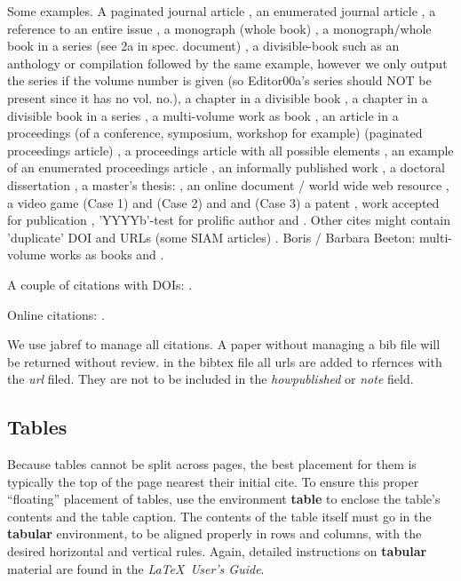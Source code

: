\documentclass[sigconf]{acmart}
\begin{document}
Some examples.  A paginated journal article \cite{Abril07}, an
enumerated journal article \cite{Cohen07}, a reference to an entire
issue \cite{JCohen96}, a monograph (whole book) \cite{Kosiur01}, a
monograph/whole book in a series (see 2a in spec. document)
\cite{Harel79}, a divisible-book such as an anthology or compilation
\cite{Editor00} followed by the same example, however we only output
the series if the volume number is given \cite{Editor00a} (so
Editor00a's series should NOT be present since it has no vol. no.), a
chapter in a divisible book \cite{Spector90}, a chapter in a divisible
book in a series \cite{Douglass98}, a multi-volume work as book
\cite{Knuth97}, an article in a proceedings (of a conference,
symposium, workshop for example) (paginated proceedings article)
\cite{Andler79}, a proceedings article with all possible elements
\cite{Smith10}, an example of an enumerated proceedings article
\cite{VanGundy07}, an informally published work \cite{Harel78}, a
doctoral dissertation \cite{Clarkson85}, a master's thesis:
\cite{anisi03}, an online document / world wide web resource
\cite{Thornburg01, Ablamowicz07, Poker06}, a video game (Case 1)
\cite{Obama08} and (Case 2) \cite{Novak03} and \cite{Lee05} and (Case
3) a patent \cite{JoeScientist001}, work accepted for publication
\cite{rous08}, 'YYYYb'-test for prolific author \cite{SaeediMEJ10} and
\cite{SaeediJETC10}. Other cites might contain 'duplicate' DOI and
URLs (some SIAM articles) \cite{Kirschmer:2010:AEI:1958016.1958018}.
Boris / Barbara Beeton: multi-volume works as books \cite{MR781536}
and \cite{MR781537}.

A couple of citations with DOIs: \cite{2004:ITE:1009386.1010128,
  Kirschmer:2010:AEI:1958016.1958018}.

Online citations: \cite{TUGInstmem, Thornburg01, CTANacmart}.  

We use jabref to manage all citations. A paper without managing a bib
file will be returned without review. in the bibtex file all urls are
added to rfernces with the {\it url} filed. They are not to be
included in the {\it howpublished} or {\it note} field. 


\subsection{Tables}

Because tables cannot be split across pages, the best placement for
them is typically the top of the page nearest their initial cite.  To
ensure this proper ``floating'' placement of tables, use the
environment \textbf{table} to enclose the table's contents and the
table caption.  The contents of the table itself must go in the
\textbf{tabular} environment, to be aligned properly in rows and
columns, with the desired horizontal and vertical rules.  Again,
detailed instructions on \textbf{tabular} material are found in the
\textit{\LaTeX\ User's Guide}.
\end{document}

